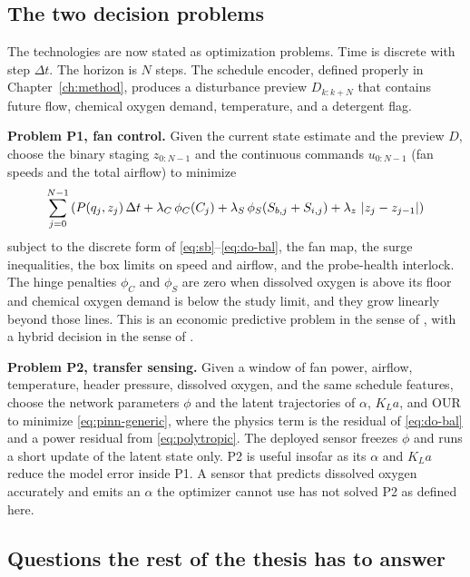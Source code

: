 \subsection{The two decision problems}

The technologies are now stated as optimization problems. Time is discrete with step $\Delta t$. The horizon is $N$ steps. The schedule encoder, defined properly in Chapter~\ref{ch:method}, produces a disturbance preview $D_{k:k+N}$ that contains future flow, chemical oxygen demand, temperature, and a detergent flag.

\textbf{Problem P1, fan control.} Given the current state estimate and the preview $D$, choose the binary staging $z_{0:N-1}$ and the continuous commands $u_{0:N-1}$ (fan speeds and the total airflow) to minimize
\begin{equation}
\label{eq:p1}
\sum_{j=0}^{N-1}
\left(
P(q_{j},z_{j})\,\Delta t
+
\lambda_{C}\,\phi_{C}(C_{j})
+
\lambda_{S}\,\phi_{S}(S_{b,j}+S_{i,j})
+
\lambda_{z}\,\left\lvert z_{j}-z_{j-1} \right\rvert
\right)
\end{equation}
subject to the discrete form of \eqref{eq:sb}--\eqref{eq:do-bal}, the fan map, the surge inequalities, the box limits on speed and airflow, and the probe-health interlock. The hinge penalties $\phi_{C}$ and $\phi_{S}$ are zero when dissolved oxygen is above its floor and chemical oxygen demand is below the study limit, and they grow linearly beyond those lines. This is an economic predictive problem in the sense of \cite{zeng2015empc,ellis2014empc,rawlings2017mpc}, with a hybrid decision in the sense of \cite{bemporad1999hybrid,cristea2011}.

\textbf{Problem P2, transfer sensing.} Given a window of fan power, airflow, temperature, header pressure, dissolved oxygen, and the same schedule features, choose the network parameters $\phi$ and the latent trajectories of $\alpha$, $K_La$, and $\mathrm{OUR}$ to minimize \eqref{eq:pinn-generic}, where the physics term is the residual of \eqref{eq:do-bal} and a power residual from \eqref{eq:polytropic}. The deployed sensor freezes $\phi$ and runs a short update of the latent state only. P2 is useful insofar as its $\alpha$ and $K_La$ reduce the model error inside P1. A sensor that predicts dissolved oxygen accurately and emits an $\alpha$ the optimizer cannot use has not solved P2 as defined here.

\subsection{Questions the rest of the thesis has to answer}

